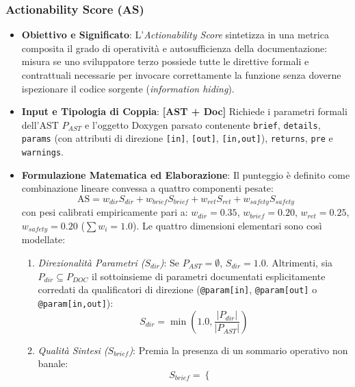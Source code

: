 \subsubsection{Actionability Score (AS)}
\label{subsubsec:actionability_score}
\begin{itemize}[leftmargin=*, label=\textbullet]
    \item \textbf{Obiettivo e Significato}: L'\emph{Actionability Score} sintetizza in una metrica composita il grado di operatività e autosufficienza della documentazione: misura se uno sviluppatore terzo possiede tutte le direttive formali e contrattuali necessarie per invocare correttamente la funzione senza doverne ispezionare il codice sorgente (\emph{information hiding}).
    \item \textbf{Input e Tipologia di Coppia}: \textbf{[AST + Doc]} Richiede i parametri formali dell'AST $P_{AST}$ e l'oggetto Doxygen parsato contenente \texttt{brief}, \texttt{details}, \texttt{params} (con attributi di direzione \texttt{[in]}, \texttt{[out]}, \texttt{[in,out]}), \texttt{returns}, \texttt{pre} e \texttt{warnings}.
    \item \textbf{Formulazione Matematica ed Elaborazione}: Il punteggio è definito come combinazione lineare convessa a quattro componenti pesate:
    \begin{equation}
        \text{AS} = w_{dir} S_{dir} + w_{brief} S_{brief} + w_{ret} S_{ret} + w_{safety} S_{safety}
        \label{eq:actionability_score}
    \end{equation}
    con pesi calibrati empiricamente pari a: $w_{dir} = 0.35$, $w_{brief} = 0.20$, $w_{ret} = 0.25$, $w_{safety} = 0.20$ ($\sum w_i = 1.0$). Le quattro dimensioni elementari sono così modellate:
    \begin{enumerate}
        \item \emph{Direzionalità Parametri ($S_{dir}$)}: Se $P_{AST} = \emptyset$, $S_{dir} = 1.0$. Altrimenti, sia $P_{dir} \subseteq P_{DOC}$ il sottoinsieme di parametri documentati esplicitamente corredati da qualificatori di direzione (\texttt{@param[in]}, \texttt{@param[out]} o \texttt{@param[in,out]}):
        \begin{equation}
            S_{dir} = \min\left(1.0, \frac{|P_{dir}|}{|P_{AST}|}\right)
        \end{equation}
        \item \emph{Qualità Sintesi ($S_{brief}$)}: Premia la presenza di un sommario operativo non banale:
        \begin{equation}
            S_{brief} = \begin{cases}

\end{cases}
\end{equation}
\end{enumerate}
\end{itemize}
